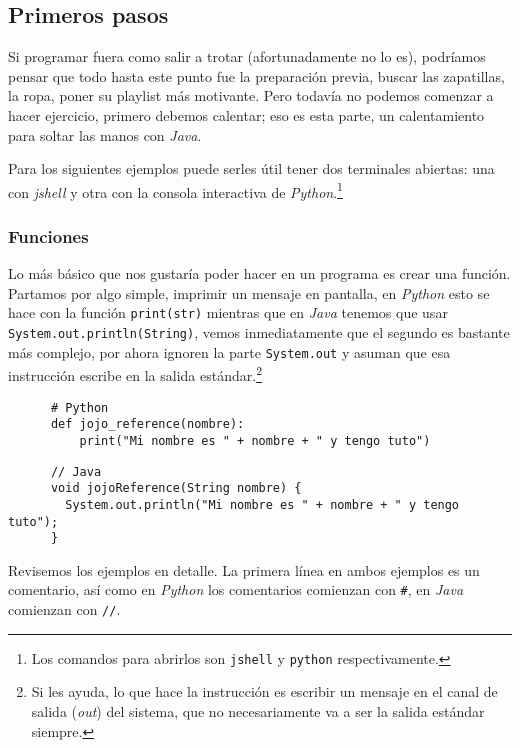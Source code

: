 \subsection{Primeros pasos}
  Si programar fuera como salir a trotar (afortunadamente no lo es), podríamos pensar que todo hasta
  este punto fue la preparación previa, buscar las zapatillas, la ropa, poner su playlist más 
  motivante.
  Pero todavía no podemos comenzar a hacer ejercicio, primero debemos calentar; eso es esta parte, 
  un calentamiento para soltar las manos con \textit{Java}.

  Para los siguientes ejemplos puede serles útil tener dos terminales abiertas: una con 
  \textit{jshell} y otra con la consola interactiva de \textit{Python}.\footnote{Los comandos para 
  abrirlos son \texttt{jshell} y \texttt{python} respectivamente.}

  \subsubsection{Funciones}
    Lo más básico que nos gustaría poder hacer en un programa es crear una función.
    Partamos por algo simple, imprimir un mensaje en pantalla, en \textit{Python} esto se hace con la 
    función \texttt{print(str)} mientras que en \textit{Java} tenemos que usar 
    \texttt{System.out.println(String)}, vemos inmediatamente que el segundo es bastante más
    complejo, por ahora ignoren la parte \texttt{System.out} y asuman que esa instrucción 
    escribe en la salida estándar.\footnote{Si les ayuda, lo que hace la instrucción es escribir un 
    mensaje en el canal de salida (\textit{out}) del sistema, que no necesariamente va a ser la salida
    estándar siempre.}

    \begin{verbatim}
      # Python
      def jojo_reference(nombre):
          print("Mi nombre es " + nombre + " y tengo tuto")
    \end{verbatim}

    \begin{verbatim}
      // Java
      void jojoReference(String nombre) {
        System.out.println("Mi nombre es " + nombre + " y tengo tuto");
      }
    \end{verbatim}

    Revisemos los ejemplos en detalle.
    La primera línea en ambos ejemplos es un comentario, así como en \textit{Python} los comentarios
    comienzan con \texttt{#}, en \textit{Java} comienzan con \texttt{//}.

